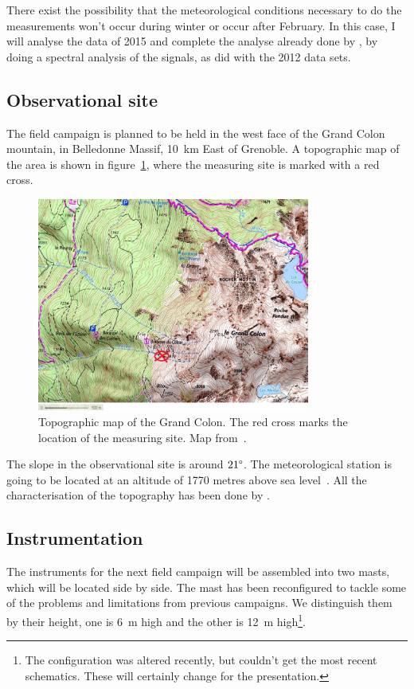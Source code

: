 There exist the possibility that the meteorological conditions necessary to do the measurements won't occur during winter or occur after February. In this case, I will analyse the data of 2015 and complete the analyse already done by \citeauthor{jakob}, by doing a spectral analysis of the signals, as \citeauthor{claudine} did with the 2012 data sets.

\subsection{Observational site}

The field campaign is planned to be held in the west face of the Grand Colon mountain, in Belledonne Massif, 10~km East of Grenoble. A topographic map of the area is shown in figure~\ref{fig:obs_site}, where the measuring site is marked with a red cross.

\begin{figure}[!ht]
  \begin{center}
  \includegraphics[width=0.8\textwidth]{fig/grand_colon_jakob.png}
  \caption{Topographic map of the Grand Colon. The red cross marks the location of the measuring site. Map from~\cite{jakob}.}
  \label{fig:obs_site}
  \end{center}
\end{figure}

The slope in the observational site is around $21\degree$. The meteorological station is going to be located at an altitude of 1770 metres above sea level~\citep{claudine}. All the characterisation of the topography has been done by \cite{alban}.

\subsection{Instrumentation} \label{instrumentation}
The instruments for the next field campaign will be assembled into two masts, which will be located side by side. The mast has been reconfigured to tackle some of the problems and limitations from previous campaigns. We distinguish them by their height, one is 6~m high and the other is 12~m high\footnote{The configuration was altered recently, but couldn't get the most recent schematics. These will certainly change for the presentation.}. 


